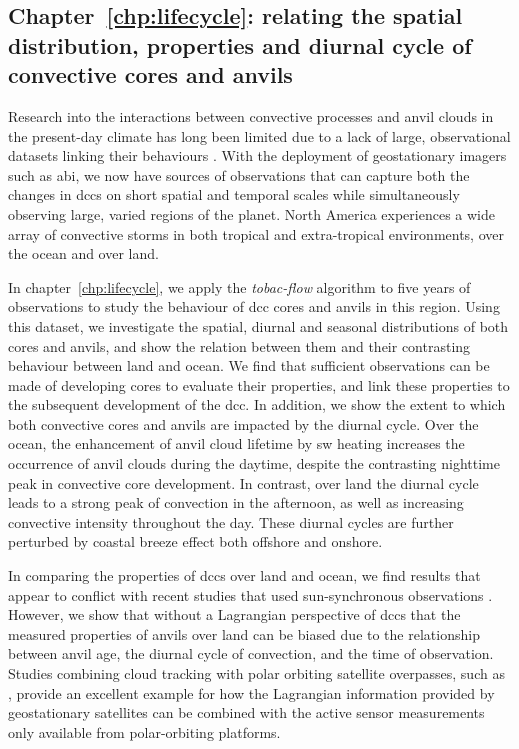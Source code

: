 \subsection{Chapter~\ref{chp:lifecycle}: relating the spatial distribution, properties and diurnal cycle of convective cores and anvils}

Research into the interactions between convective processes and anvil clouds in the present-day climate has long been limited due to a lack of large, observational datasets linking their behaviours \citep{gasparini_opinion_2023}.
With the deployment of geostationary imagers such as \acrshort{abi}, we now have sources of observations that can capture both the changes in \acrshort{dcc}s on short spatial and temporal scales while simultaneously observing large, varied regions of the planet.
North America experiences a wide array of convective storms in both tropical and extra-tropical environments, over the ocean and over land.

In chapter~\ref{chp:lifecycle}, we apply the \textit{tobac-flow} algorithm to five years of observations to study the behaviour of \acrshort{dcc} cores and anvils in this region. 
Using this dataset, we investigate the spatial, diurnal and seasonal distributions of both cores and anvils, and show the relation between them and their contrasting behaviour between land and ocean.
We find that sufficient observations can be made of developing cores to evaluate their properties, and link these properties to the subsequent development of the \acrshort{dcc}.
In addition, we show the extent to which both convective cores and anvils are impacted by the diurnal cycle.
Over the ocean, the enhancement of anvil cloud lifetime by \acrshort{sw} heating \citep{gasparini_diurnal_2022} increases the occurrence of anvil clouds during the daytime, despite the contrasting nighttime peak in convective core development.
In contrast, over land the diurnal cycle leads to a strong peak of convection in the afternoon, as well as increasing convective intensity throughout the day.
These diurnal cycles are further perturbed by coastal breeze effect both offshore and onshore.

In comparing the properties of \acrshort{dcc}s over land and ocean, we find results that appear to conflict with recent studies that used sun-synchronous observations \citep{ge_contrasting_2024}.
However, we show that without a Lagrangian perspective of \acrshort{dcc}s that the measured properties of anvils over land can be biased due to the relationship between anvil age, the diurnal cycle of convection, and the time of observation.
Studies combining cloud tracking with polar orbiting satellite overpasses, such as \citep{bouniol_life_2021}, provide an excellent example for how the Lagrangian information provided by geostationary satellites can be combined with the active sensor measurements only available from polar-orbiting platforms.

